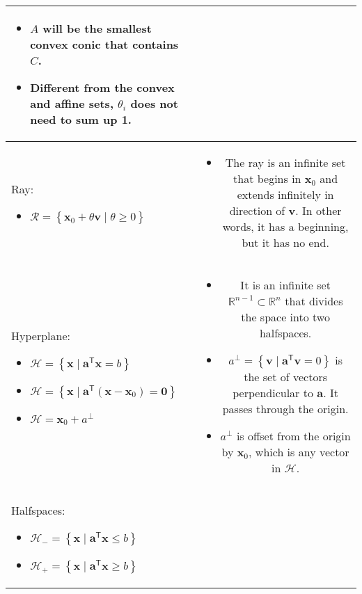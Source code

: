 \documentclass{article}
\newcommand{\trans}{\mathsf{T}}
\begin{document}
\begin{table}[ht!]
\begin{tabularx}{\textwidth}{|A|C|}
\begin{itemize}[leftmargin=*]
    \item $A$ will be the smallest convex conic that contains $C$.
    \item Different from the convex and affine sets, \(\theta_i\) does not need to sum up 1.
\end{itemize}\\
\hline
Ray:
\begin{itemize}[leftmargin=*]
    \item \(\mathcal{R} = \left\{ \mathbf{x}_0 + \theta \mathbf{v} \mid \theta \geq 0 \right\}\)
\end{itemize} & \vspace{-3.5ex} \begin{itemize}[leftmargin=*]
    \item The ray is an infinite set that begins in \(\mathbf{x}_0\) and extends infinitely in direction of \(\mathbf{v}\). In other words, it has a beginning, but it has no end.
\end{itemize} \\
\hline
Hyperplane:
\begin{itemize}[leftmargin=*]
    \item \( \mathcal{H} = \left\{ \mathbf{x} \mid \mathbf{a}^\trans \mathbf{x} = b \right\}\)
    \item \(\mathcal{H} = \left\{ \mathbf{x} \mid \mathbf{a}^\trans (\mathbf{x} - \mathbf{x}_{0}) = \mathbf{0} \right\}\)
    \item \(\mathcal{H} = \mathbf{x}_0 + a^{\perp} \)
\end{itemize} & \vspace{-3.5ex}
\begin{itemize}[leftmargin=*]
    \item It is an infinite set \(\mathbb{R}^{n-1} \subset \mathbb{R}^{n}\) that divides the space into two halfspaces.
    \item \(a^{\perp} = \left\{ \mathbf{v} \mid \mathbf{a}^\trans \mathbf{v} = 0 \right\}\) is the set of vectors perpendicular to \(\mathbf{a}\). It passes through the origin.
    \item \(a^{\perp}\) is offset from the origin by \(\mathbf{x}_0\), which is any vector in \(\mathcal{H}\).
\end{itemize} \\
\hline
Halfspaces:
\begin{itemize}[leftmargin=*]
    \item \(\mathcal{H}_{-} = \left\{ \mathbf{x} \mid \mathbf{a}^\trans \mathbf{x} \leq b \right\}\)
    \item \(\mathcal{H}_{+} = \left\{ \mathbf{x} \mid \mathbf{a}^\trans \mathbf{x} \geq b \right\}\)

\end{itemize}
\end{tabularx}
\end{table}
\end{document}
